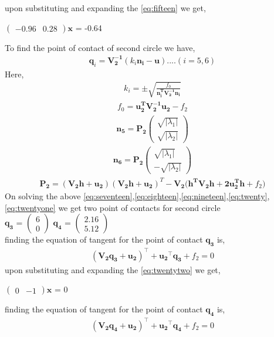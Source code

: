 \documentclass[journal,12pt,twocolumn]{IEEEtran}
\newcommand{\myvec}[1]{\ensuremath{\begin{pmatrix}#1\end{pmatrix}}}
\let\vec\mathbf
\begin{document}
upon substituting and expanding the \eqref{eq:fifteen} we get,
\begin{center}
$\myvec{-0.96 & 0.28}\vec{x}$ = -0.64
\end{center}

To find the point of contact of second circle we have, \\
\begin{align}
\label{eq:sixteen}
\boxed{\vec{q}_i = \vec{V_2^{-1}}(k_i\vec{n_i-u})}....(i = 5,6) 
\end{align}
Here, 
\begin{align}
\label{eq:seventeen}
k_i = \pm\sqrt{\frac{f_0}{\vec{n_i^TV_2^{-1}n_i}}}
\end{align}
\begin{align}
\label{eq:eighteen}
f_0 = \vec{u_2^TV_2^{-1}u_2}-f_2
\end{align}
\begin{align}
\label{eq:nineteen}
\vec{n_5} = \vec{P_2}\myvec{\sqrt{|\lambda_1|} \\ \sqrt{|\lambda_2|}}
\end{align}
\begin{align}
\label{eq:twenty}
\vec{n_6} = \vec{P_2}\myvec{\sqrt{|\lambda_1|} \\ -\sqrt{|\lambda_2|}}
\end{align}
\begin{align}
\label{eq:twentyone}
\vec{P_2} = (\vec{V_2h+u_2})(\vec{V_2h+u_2})^T-\vec{V_2(h^TV_2h+2u_2^Th}+f_2)
\end{align}
On solving the above \eqref{eq:seventeen},\eqref{eq:eighteen},\eqref{eq:nineteen},\eqref{eq:twenty},\eqref{eq:twentyone} we get two point of contacts for second circle \\

$\vec{q_3}$ = $\myvec{6 \\ 0}$
$\vec{q_4}$ = $\myvec{2.16 \\ 5.12}$ \\

finding the equation of tangent for the point of contact $\vec{q_3}$ is,
\begin{align}
\label{eq:twentytwo}
(\vec{V_2}\vec{q_3}+\vec{u_2})^{\top}+\vec{u_2}^{\top}\vec{q_3} + f_2 = 0
\end{align}
upon substituting and expanding the \eqref{eq:twentytwo} we get,
\begin{center}
$\myvec{0 & -1}\vec{x}$ = 0 \\
\end{center}
finding the equation of tangent for the point of contact $\vec{q_4}$ is,
\begin{align}
\label{eq:twentythree}
(\vec{V_2}\vec{q_4}+\vec{u_2})^{\top}+\vec{u_2}^{\top}\vec{q_4} + f_2 = 0 
\end{align}
\end{document}
